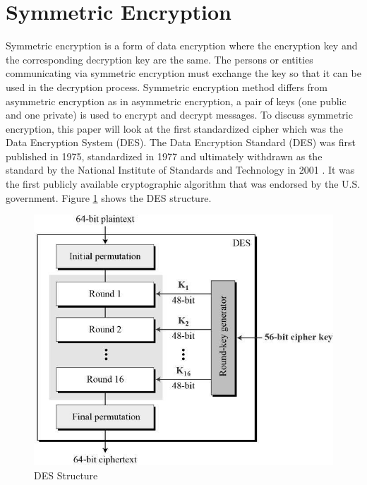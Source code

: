 \documentclass[journal]{IEEEtran}
\begin{document}
\section{\textbf{Symmetric Encryption}}
Symmetric encryption is a form of data encryption where the encryption key and the corresponding decryption key are the same. The persons or entities communicating via symmetric encryption must exchange the key so that it can be used in the decryption process. Symmetric encryption method differs from asymmetric encryption as in asymmetric encryption, a pair of keys (one public and one private) is used to encrypt and decrypt messages. To discuss symmetric encryption, this paper will look at the first standardized cipher which was the Data Encryption System (DES). 
\newline \newline
The Data Encryption Standard (DES) was first published in 1975, standardized in 1977 and ultimately withdrawn as the standard by the National Institute of Standards and Technology in 2001 \cite{des}. It was the first publicly available cryptographic algorithm that was endorsed by the U.S. government. Figure \ref{fig:des} shows the DES structure.
\newline
\newline
\begin{figure}[!h]
    \centering
    \includegraphics[scale=.3]{des_structure}
    \caption{DES Structure}
    \label{fig:des}
\end{figure}
\end{document}
